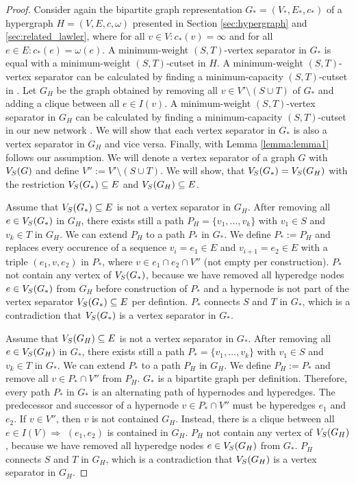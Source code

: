 \begin{proof}

Consider again the bipartite graph representation $G_* = (V_*,E_*,c_*)$ 
of a hypergraph $H = (V,E,c,\omega)$ presented in Section \ref{sec:hypergraph} and \ref{sec:related_lawler}, 
where for all $v \in V: c_*(v) = \infty$ and for all $e \in E: c_*(e) = 
\omega(e)$. A minimum-weight $(S,T)$-vertex separator in $G_*$ is equal
with a minimum-weight $(S,T)$-cutset in $H$. A minimum-weight $(S,T)$-vertex separator can be calculated
by finding a minimum-capacity $(S,T)$-cutset in . Let $G_H$ be the graph obtained by removing
all $v \in V'\setminus (S \cup T)$ of $G_*$ and adding a clique between all $e \in I(v)$. 
A minimum-weight $(S,T)$-vertex separator in $G_H$ can be calculated by finding a 
minimum-capacity $(S,T)$-cutset in our new network .
We will show that each vertex separator in $G_*$ is also a vertex separator in $G_H$ and
vice versa. Finally, with Lemma \ref{lemma:lemma1} follows our assumption. We will 
denote a vertex separator of a graph $G$ with $V_S(G)$ and define $V'' := V' \setminus (S \cup T)$. 
We will show, that $V_S(G_*) = V_S(G_H)$ with the restriction $V_S(G_*) \subseteq E$ and
$V_S(G_H) \subseteq E$.

Assume that $V_S(G_*) \subseteq E$ is not a vertex separator in $G_H$. After removing all $e \in V_S(G_*)$ in
$G_H$, there exists still a path $P_H = \{v_1, \ldots, v_k\}$ with $v_1 \in S$ and
$v_k \in T$ in $G_H$. We can extend $P_H$ to a path $P_*$ in $G_*$.
We define $P_* := P_H$ and replaces every occurence of a sequence $v_i = e_1 \in E$ and
$v_{i+1} = e_2 \in E$ with a triple $(e_1,v,e_2)$ in $P_*$, where $v \in e_1 \cap e_2 \cap V''$
(not empty per construction). $P_*$ not contain any vertex of $V_S(G_*)$, because
we have removed all hyperedge nodes $e \in V_S(G_*)$ from $G_H$ before construction of $P_*$ 
and a hypernode is not part of  the vertex separator $V_S(G_*) \subseteq E$ per defintion. 
$P_*$ connects $S$ and $T$ in $G_*$, which is a contradiction that $V_S(G_*)$ 
is a vertex separator in $G_*$.

Assume that $V_S(G_H) \subseteq E$ is not a vertex separator in $G_*$. After removing all $e \in V_S(G_H)$ in
$G_*$, there exists still a path $P_* = \{v_1, \ldots, v_k\}$ with $v_1 \in S$ and
$v_k \in T$ in $G_*$. We can extend $P_*$ to a path $P_H$ in $G_H$.
We define $P_H := P_*$ and remove all $v \in P_* \cap V''$ from $P_H$. $G_*$ is a bipartite
graph per definition. Therefore, every path $P_*$ in $G_*$ is an alternating path of hypernodes and
hyperedges. The predecessor and successor of a hypernode $v \in P_* \cap V''$ must be hyperedges
$e_1$ and $e_2$. If $v \in V''$, then $v$ is not contained $G_H$. Instead, there is
a clique between all $e \in I(V) \Rightarrow$ $(e_1,e_2)$ is contained in $G_H$.
$P_H$ not contain any vertex of $V_S(G_H)$, because we have removed all hyperedge nodes $e \in V_S(G_H)$ 
from $G_*$. $P_H$ connects $S$ and $T$ in $G_H$, which is a contradiction that 
$V_S(G_H)$ is a vertex separator in $G_H$.


\end{proof}
